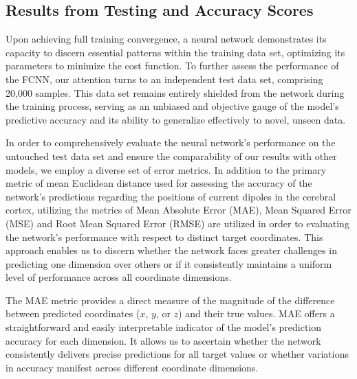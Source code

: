 \documentclass[a4paper, UKenglish, 11pt]{uiomaster}
\begin{document}
\subsection{Results from Testing and Accuracy Scores}
Upon achieving full training convergence, a neural network demonstrates its capacity to discern essential patterns within the training data set, optimizing its parameters to minimize the cost function. To further assess the performance of the FCNN, our attention turns to an independent test data set, comprising 20,000 samples. This data set remains entirely shielded from the network during the training process, serving as an unbiased and objective gauge of the model's predictive accuracy and its ability to generalize effectively to novel, unseen data.

In order to comprehensively evaluate the neural network's performance on the untouched test data set and ensure the comparability of our results with other models, we employ a diverse set of error metrics. In addition to the primary metric of mean Euclidean distance used for assessing the accuracy of the network's predictions regarding the positions of current dipoles in the cerebral cortex, utilizing the metrics of Mean Absolute Error (MAE), Mean Squared Error (MSE) and Root Mean Squared Error (RMSE) are utilized in order to evaluating the network's performance with respect to distinct target coordinates. This approach enables us to discern whether the network faces greater challenges in predicting one dimension over others or if it consistently maintains a uniform level of performance across all coordinate dimensions.

The MAE metric provides a direct measure of the magnitude of the difference between predicted coordinates ($x$, $y$, or $z$) and their true values. MAE offers a straightforward and easily interpretable indicator of the model's prediction accuracy for each dimension. It allows us to ascertain whether the network consistently delivers precise predictions for all target values or whether variations in accuracy manifest across different coordinate dimensions.
\end{document}
